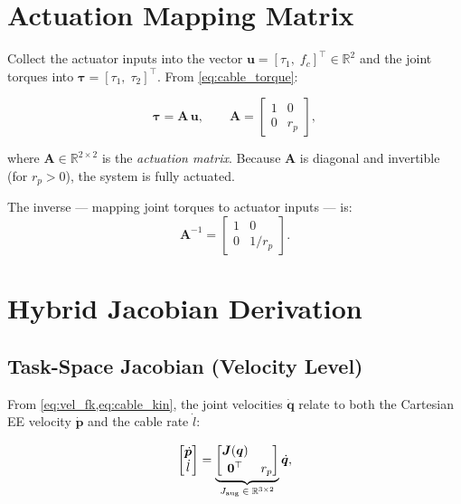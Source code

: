 \documentclass[12pt, a4paper]{article}
\theoremstyle{definition}
\newcommand{\bq}{\bm{q}}
\newcommand{\bp}{\bm{p}}
\newcommand{\bu}{\bm{u}}
\newcommand{\btau}{\bm{\tau}}
\newcommand{\bJ}{\bm{J}}
\newcommand{\bA}{\bm{A}}
\begin{document}
\section{Actuation Mapping Matrix}
\label{sec:act_map}

Collect the actuator inputs into the vector
$\bu = [\tau_1,\; f_c]^\top \in \mathbb{R}^2$ and the joint torques into
$\btau = [\tau_1,\; \tau_2]^\top$.  From \cref{eq:cable_torque}:

\begin{equation}
  \label{eq:act_map}
  \btau = \bA\,\bu,
  \qquad
  \bA =
  \begin{bmatrix}
    1 & 0 \\
    0 & r_p
  \end{bmatrix},
\end{equation}

where $\bA \in \mathbb{R}^{2 \times 2}$ is the \emph{actuation matrix}.
Because $\bA$ is diagonal and invertible (for $r_p > 0$), the system is
fully actuated.

The inverse --- mapping joint torques to actuator inputs --- is:
\begin{equation}
  \bA^{-1} =
  \begin{bmatrix}
    1 & 0 \\
    0 & 1/r_p
  \end{bmatrix}.
\end{equation}

\section{Hybrid Jacobian Derivation}
\label{sec:hybrid_jac}

\subsection{Task-Space Jacobian (Velocity Level)}
\label{sec:task_vel}

From \cref{eq:vel_fk,eq:cable_kin}, the joint velocities $\dot{\bq}$ relate to
both the Cartesian EE velocity $\dot{\bp}$ and the cable rate $\dot{l}$:

\begin{equation}
  \label{eq:augmented}
  \begin{bmatrix}
    \dot{\bp} \\ \dot{l}
  \end{bmatrix}
  =
  \underbrace{%
    \begin{bmatrix}
      \bJ(\bq) \\[2pt]
      \bm{0}^\top & r_p
    \end{bmatrix}
  }_{J_{\text{aug}} \;\in\; \mathbb{R}^{3 \times 2}}
  \dot{\bq},
\end{equation}
\end{document}
